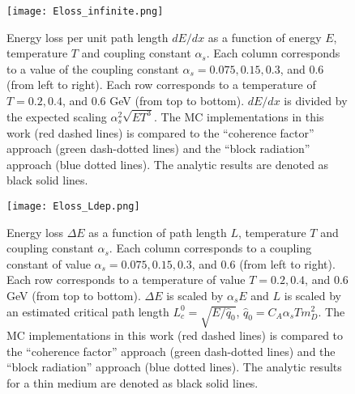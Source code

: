 \begin{figure}
\singlespacing
\centering
\texttt{[image: Eloss\_infinite.png]}
\caption[Energy loss per unit path length $dE/dx$ as a function of energy $E$,]{Energy loss per unit path length $dE/dx$ as a function of energy $E$, temperature $T$ and coupling constant $\alpha_s$. Each column corresponds to a value of the coupling constant $\alpha_s = 0.075, 0.15, 0.3$, and $0.6$ (from left to right). Each row corresponds to a temperature of $T = 0.2, 0.4$, and $0.6$ GeV (from top to bottom). $dE/dx$ is divided by the expected scaling $\alpha_s^2 \sqrt{ET^3}$. The MC implementations in this work (red dashed lines) is compared to the ``coherence factor'' approach (green dash-dotted lines) and the ``block radiation'' approach (blue dotted lines). The analytic results are denoted as black solid lines.}
\label{fig:eloss-inf}
\end{figure}

\begin{figure}
\singlespacing
\centering
\texttt{[image: Eloss\_Ldep.png]}
\caption[Energy loss $\Delta E$ as a function of path length $L$, temperature $T$]{Energy loss $\Delta E$ as a function of path length $L$, temperature $T$ and coupling constant $\alpha_s$. Each column corresponds to a coupling constant of value $\alpha_s = 0.075, 0.15, 0.3$, and $0.6$ (from left to right). Each row corresponds to a temperature of value $T = 0.2, 0.4$, and $0.6$ GeV (from top to bottom). $\Delta E$ is scaled by $\alpha_s E$ and $L$ is scaled by an estimated critical path length $L_c^0 = \sqrt{E/\hat{q}_0}$, $\hat{q}_0 = C_A \alpha_s T m_D^2$. The MC implementations in this work (red dashed lines) is compared to the ``coherence factor'' approach (green dash-dotted lines) and the ``block radiation'' approach (blue dotted lines). The analytic results for a thin medium are denoted as black solid lines.}
\label{fig:eloss-ldep}
\end{figure}

